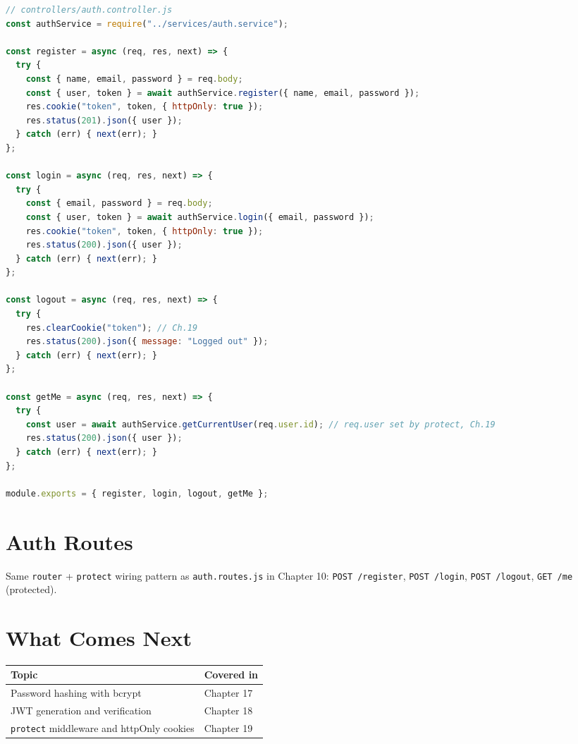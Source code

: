 \begin{lstlisting}[language=JavaScript]
// controllers/auth.controller.js
const authService = require("../services/auth.service");

const register = async (req, res, next) => {
  try {
    const { name, email, password } = req.body;
    const { user, token } = await authService.register({ name, email, password });
    res.cookie("token", token, { httpOnly: true });
    res.status(201).json({ user });
  } catch (err) { next(err); }
};

const login = async (req, res, next) => {
  try {
    const { email, password } = req.body;
    const { user, token } = await authService.login({ email, password });
    res.cookie("token", token, { httpOnly: true });
    res.status(200).json({ user });
  } catch (err) { next(err); }
};

const logout = async (req, res, next) => {
  try {
    res.clearCookie("token"); // Ch.19
    res.status(200).json({ message: "Logged out" });
  } catch (err) { next(err); }
};

const getMe = async (req, res, next) => {
  try {
    const user = await authService.getCurrentUser(req.user.id); // req.user set by protect, Ch.19
    res.status(200).json({ user });
  } catch (err) { next(err); }
};

module.exports = { register, login, logout, getMe };
\end{lstlisting}

\section{Auth Routes}

Same \texttt{router} + \texttt{protect} wiring pattern as \texttt{auth.routes.js} in Chapter 10: \texttt{POST /register}, \texttt{POST /login}, \texttt{POST /logout}, \texttt{GET /me} (protected).

\section{What Comes Next}

\begin{table}[h]
\centering
\begin{tabularx}{\textwidth}{l X}
\toprule
\textbf{Topic} & \textbf{Covered in} \\
\midrule
Password hashing with bcrypt        & Chapter 17 \\
JWT generation and verification      & Chapter 18 \\
\texttt{protect} middleware and httpOnly cookies & Chapter 19 \\
\bottomrule
\end{tabularx}
\end{table}

